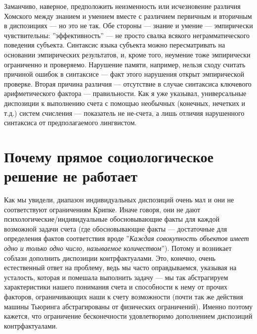 \documentclass[11pt]{book}
\begin{document}
Заманчиво, наверное, предположить неизменность или исчезновение различия Хомского между знанием и умением вместе с различием первичным и вторичным в диспозициях --- но это не так. Обе стороны --- знание и умение --- эмпирически чувствительны: ''эффективность'' --- не просто свалка всякого неграмматического поведения субъекта. Синтаксис языка субъекта можно пересматривать на основании эмпирических результатов, и, кроме того, неумение тоже эмпирически ограниченно и проверяемо. Нарушение памяти, например, нельзя сходу считать причиной ошибок в синтаксисе --- факт этого нарушения открыт эмпирической проверке. Вторая причина различия --- отсутствие в случае синтаксиса ключевого арифметического фактора --- правильности. Как я уже указывал, универсальные диспозиции к выполнению счета с помощью необычных (конечных, нечетких и т.д.) систем счисления --- показатель не не-счета, а лишь отличия нарушенного синтаксиса от предполагаемого лингвистом.

\section{Почему прямое социологическое решение не работает}

Как мы увидели, диапазон индивидуальных диспозиций очень мал и они не соответствуют ограничениям Крипке. Иначе говоря, они не дают психологические/индивидуальные обосновывающие факты для каждой возможной задачи счета (где обосновывающие факты --- достаточные для определения фактов соответствия вроде ''\textit{Каждая совокупность объектов имеет одно и только одно число, называемое количеством}''). Потому и возникает соблазн дополнить диспозиции контрфактуалами. Это, конечно, очень естественный ответ на проблему, ведь мы часто оправдываемся, указывая на усталость, которая и помешала выполнить задачу --- мы так абстрагируем характеристики нашего понимания счета и способности к нему от прочих факторов, ограничивающих наши к счету возможности (почти так же действия машины Тьюринга абстрагированы от физических ограничений). Именно поэтому кажется, что ограничение бесконечности удовлетворимо дополнением диспозиций контрфактуалами.
\end{document}
